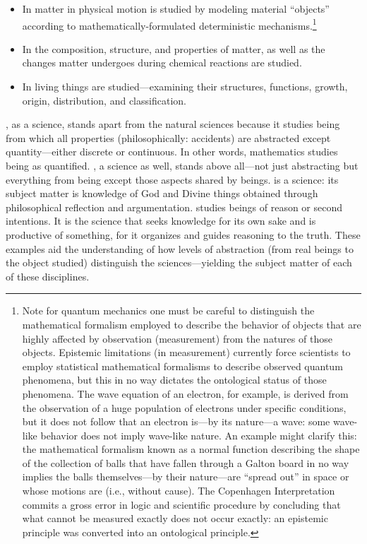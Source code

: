 \begin{itemize}
\item In  matter in physical motion is studied by modeling material ``objects'' according to mathematically-formulated deterministic mechanisms.\footnote{Note for quantum mechanics one must be careful to distinguish the mathematical formalism employed to describe the behavior of objects that are highly affected by observation (measurement) from the natures of those objects. Epistemic limitations (in measurement) currently force scientists to employ statistical mathematical formalisms to describe observed quantum phenomena, but this in no way dictates the ontological status of those phenomena. The wave equation of an electron, for example, is derived from the observation of a huge population of electrons under specific conditions, but it does not follow that an electron is---by its nature---a wave: some wave-like behavior does not imply wave-like nature. An example might clarify this: the mathematical formalism known as a normal function describing the shape of the collection of balls that have fallen through a Galton board in no way implies the balls themselves---by their nature---are ``spread out'' in space or whose motions are  (i.e., without cause). The Copenhagen Interpretation commits a gross error in logic and scientific procedure by concluding that what cannot be measured exactly does not occur exactly: an epistemic principle was converted into an ontological principle.}
\item In  the composition, structure, and properties of matter, as well as the changes matter undergoes during chemical reactions are studied.
\item In  living things are studied---examining their structures, functions, growth, origin, distribution, and classification.
\end{itemize}

, as a science, stands apart from the natural sciences because it studies being from which all properties (philosophically: accidents) are abstracted except quantity---either discrete or continuous. In other words, mathematics studies being as quantified. , a science as well, stands above all---not just abstracting but  everything from being except those aspects shared by  beings.  is a science: its subject matter is knowledge of God and Divine things obtained through philosophical reflection and argumentation.  studies beings of reason or second intentions. It is the science that seeks knowledge for its own sake and is productive of something, for it organizes and guides reasoning to the truth. These examples aid the understanding of how levels of abstraction (from real beings to the object studied) distinguish the sciences---yielding the subject matter of each of these disciplines.


